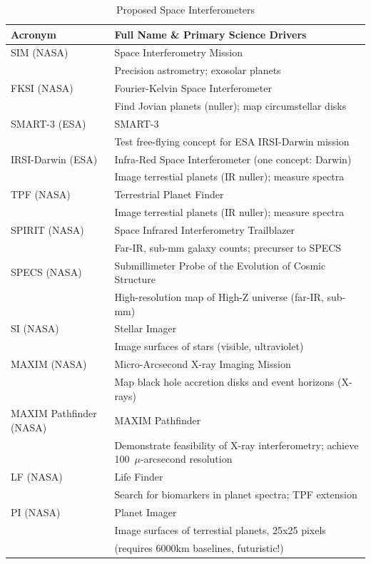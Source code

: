 \documentclass[12pt]{article}
\begin{document}
\begin{table}

\footnotesize
\caption {Proposed Space Interferometers}
\label{table:space_interferometers}
\begin{center}
\begin{tabular}{l|l}
\footnotesize

Acronym  & Full Name \&   Primary Science Drivers \\
\hline
SIM (NASA) & Space Interferometry Mission  \\
& Precision astrometry; exosolar planets \\
\hline
FKSI (NASA) & Fourier-Kelvin Space Interferometer \\
& Find Jovian planets (nuller); map circumstellar disks \\
\hline
SMART-3 (ESA) & SMART-3 \\ 
 & Test free-flying concept for ESA IRSI-Darwin mission \\
\hline
IRSI-Darwin (ESA) & Infra-Red Space Interferometer (one concept: Darwin) \\
& Image terrestial planets (IR nuller); measure spectra\\
\hline
TPF (NASA) & Terrestrial Planet Finder \\
& Image terrestial planets (IR nuller); measure spectra \\
\hline
SPIRIT (NASA) & Space Infrared Interferometry Trailblazer  \\
 & Far-IR, sub-mm galaxy counts; precurser to SPECS \\
\hline
SPECS (NASA) & Submillimeter Probe of the Evolution of Cosmic Structure\\
 & High-resolution map of High-Z universe (far-IR, sub-mm) \\
\hline
SI (NASA) & Stellar Imager \\
 & Image surfaces of stars (visible, ultraviolet) \\
\hline
MAXIM (NASA) & Micro-Arcsecond X-ray Imaging Mission \\
 & Map black hole accretion disks and event horizons (X-rays) \\
\hline
MAXIM Pathfinder (NASA) & MAXIM Pathfinder \\
 & Demonstrate feasibility of X-ray interferometry; achieve 100~$\mu$-arcsecond 
resolution\\
\hline
LF (NASA) & Life Finder  \\
 & Search for biomarkers in planet spectra; TPF extension \\
\hline
PI (NASA) & Planet Imager  \\
 &Image surfaces of terrestial planets, 25x25 pixels \\
& (requires 6000km baselines, futuristic!) \\
\hline
\end{tabular}
\end{center}

\end{table}
\end{document}
